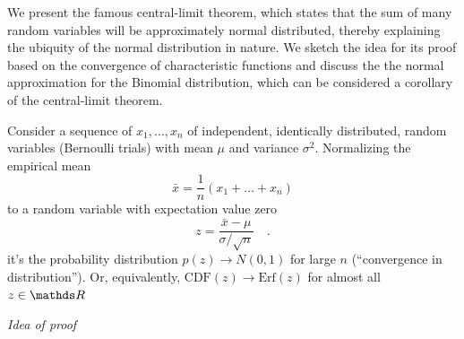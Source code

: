 \documentclass{notebook}
\begin{document}
We present the famous central-limit theorem, which states that the sum of many random variables will be approximately normal distributed, thereby explaining the ubiquity of the normal distribution in nature. We sketch the idea for its proof based on the convergence of characteristic functions and discuss the the normal approximation for the Binomial distribution, which can be considered a corollary of the central-limit theorem.

\begin{theorem}
	Consider a sequence of $x_1, \dots, x_n$ of independent, identically distributed, random variables (Bernoulli trials) with mean $\mu$ and variance $\sigma^2$. Normalizing the empirical mean
	\begin{equation}
	\bar{x} = \frac{1}{n}(x_1 + \dots + x_n)
	\end{equation}
	to a random variable with expectation value zero
	\begin{equation}
	z = \frac{\bar{x}-\mu}{\sigma/\sqrt{n}} \quad.
	\end{equation}
	it's the probability distribution $p(z) \to N(0,1)$ for large $n$ (``convergence in distribution''). Or, equivalently, $\mathrm{CDF}(z) \to \mathrm{Erf}(z)$ for almost all $z \in \R$	
\end{theorem}

\textit{Idea of proof}
\end{document}
